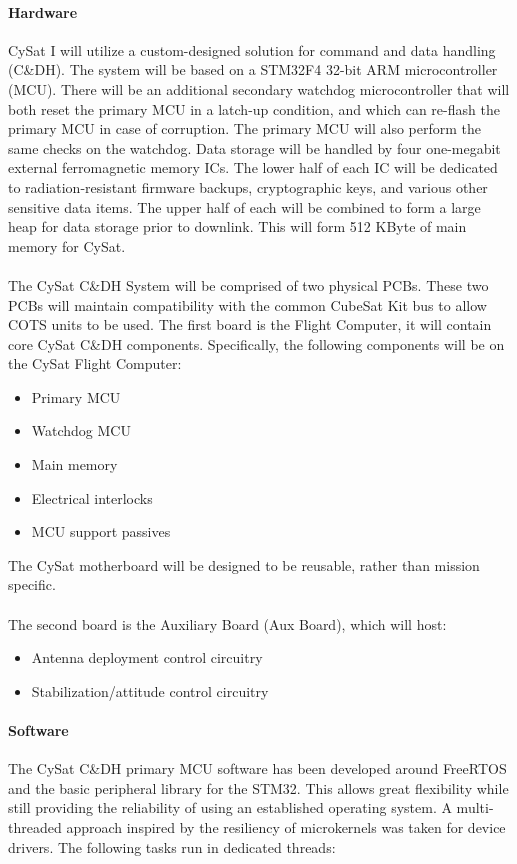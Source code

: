 \documentclass[nocover]            %
{CSLI}                       %
\begin{document}
\paragraph{Hardware\\}
CySat I will utilize a custom-designed solution for command and data handling (C\&DH). The system will be based on a STM32F4 32-bit ARM microcontroller (MCU). There will be an additional secondary watchdog microcontroller that will both reset the primary MCU in a latch-up condition, and which can re-flash the primary MCU in case of corruption. The primary MCU will also perform the same checks on the watchdog. Data storage will be handled by four one-megabit external ferromagnetic memory ICs. The lower half of each IC will be dedicated to radiation-resistant firmware backups, cryptographic keys, and various other sensitive data items. The upper half of each will be combined to form a large heap for data storage prior to downlink. This will form 512 KByte of main memory for CySat.\\
\\The CySat C\&DH System will be comprised of two physical PCBs. These two PCBs will maintain compatibility with the common CubeSat Kit bus to allow COTS units to be used. The first board is the Flight Computer, it will contain core CySat C\&DH components. Specifically, the following components will be on the CySat Flight Computer:
\begin{itemize}
\item Primary MCU
\item Watchdog MCU
\item Main memory
\item Electrical interlocks
\item MCU support passives
\end{itemize}
The CySat motherboard will be designed to be reusable, rather than mission specific.\\
\\The second board is the Auxiliary Board (Aux Board), which will host:
\begin{itemize}
\item Antenna deployment control circuitry
\item Stabilization/attitude control circuitry
\end{itemize}

\paragraph{Software\\}
The CySat C\&DH primary MCU software has been developed around FreeRTOS and the basic peripheral library for the STM32. This allows great flexibility while still providing the reliability of using an established operating system. A multi-threaded approach inspired by the resiliency of microkernels was taken for device drivers. The following tasks run in dedicated threads:
\end{document}
